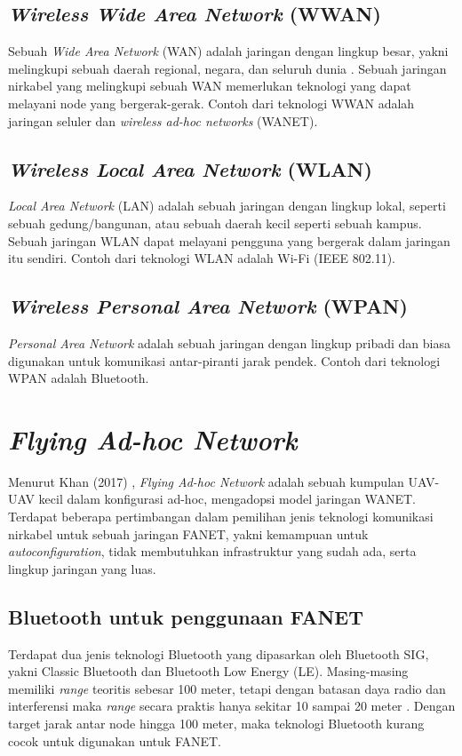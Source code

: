 \subsection{\textit{Wireless Wide Area Network} (WWAN)}
Sebuah \textit{Wide Area Network} (WAN) adalah jaringan dengan lingkup besar, yakni melingkupi sebuah daerah regional, negara, dan seluruh dunia \cite{data_communications_and_networking}. Sebuah jaringan nirkabel yang melingkupi sebuah WAN memerlukan teknologi yang dapat melayani node yang bergerak-gerak. Contoh dari teknologi WWAN adalah jaringan seluler dan \textit{wireless ad-hoc networks} (WANET).
\subsection{\textit{Wireless Local Area Network} (WLAN)}
\textit{Local Area Network} (LAN) adalah sebuah jaringan dengan lingkup lokal, seperti sebuah gedung/bangunan, atau sebuah daerah kecil seperti sebuah kampus. Sebuah jaringan WLAN dapat melayani pengguna yang bergerak dalam jaringan itu sendiri. Contoh dari teknologi WLAN adalah Wi-Fi (IEEE 802.11).
\subsection{\textit{Wireless Personal Area Network} (WPAN)}
\textit{Personal Area Network} adalah sebuah jaringan dengan lingkup pribadi dan biasa digunakan untuk komunikasi antar-piranti jarak pendek. Contoh dari teknologi WPAN adalah Bluetooth.

\section{\textit{Flying Ad-hoc Network}}
Menurut Khan (2017)  \cite{khanFlyingAdhocNetworks2017}, \textit{Flying Ad-hoc Network} adalah sebuah kumpulan UAV-UAV kecil dalam konfigurasi ad-hoc, mengadopsi model jaringan WANET. Terdapat beberapa pertimbangan dalam pemilihan jenis teknologi komunikasi nirkabel untuk sebuah jaringan FANET, yakni kemampuan untuk \textit{autoconfiguration}, tidak membutuhkan infrastruktur yang sudah ada, serta lingkup jaringan yang luas.
\subsection{Bluetooth untuk penggunaan FANET}
Terdapat dua jenis teknologi Bluetooth yang dipasarkan oleh Bluetooth SIG, yakni Classic Bluetooth dan Bluetooth Low Energy (LE). Masing-masing memiliki \textit{range} teoritis sebesar 100 meter, tetapi dengan batasan daya radio dan interferensi maka \textit{range} secara praktis hanya sekitar 10 sampai 20 meter \cite{noauthor_all_nodate}. Dengan target jarak antar node hingga 100 meter, maka teknologi Bluetooth kurang cocok untuk digunakan untuk FANET.
